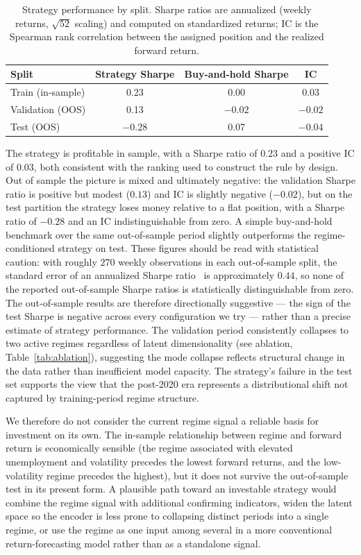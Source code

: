 \documentclass[conference]{IEEEtran}
\begin{document}
\begin{table}[h]
\centering
\caption{Strategy performance by split. Sharpe ratios are annualized
(weekly returns, $\sqrt{52}$ scaling) and computed on standardized returns;
IC is the Spearman rank correlation between the assigned position and the
realized forward return.}
\label{tab:strategy-results}
\begin{tabular}{lccc}
\toprule
Split & Strategy Sharpe & Buy-and-hold Sharpe & IC \\
\midrule
Train (in-sample) & 0.23 & 0.00 & 0.03 \\
Validation (OOS) & 0.13 & $-0.02$ & $-0.02$ \\
Test (OOS) & $-0.28$ & 0.07 & $-0.04$ \\
\bottomrule
\end{tabular}
\end{table}

The strategy is profitable in sample, with a Sharpe ratio of $0.23$ and a
positive IC of $0.03$, both consistent with the ranking used to construct the
rule by design. Out of sample the picture is mixed and ultimately negative: the
validation Sharpe ratio is positive but modest ($0.13$) and IC is slightly
negative ($-0.02$), but on the test partition the strategy loses money relative
to a flat position, with a Sharpe ratio of $-0.28$ and an IC indistinguishable
from zero. A simple buy-and-hold benchmark over the same out-of-sample period
slightly outperforms the regime-conditioned strategy on test. These figures
should be read with statistical caution: with roughly $270$ weekly observations
in each out-of-sample split, the standard error of an annualized Sharpe
ratio~\cite{lo2002statistics} is approximately $0.44$, so none of the reported
out-of-sample Sharpe ratios is statistically distinguishable from zero. The
out-of-sample results are therefore directionally suggestive --- the sign of the
test Sharpe is negative across every configuration we try --- rather than a
precise estimate of strategy performance. The validation period consistently
collapses to two active regimes regardless of latent
dimensionality (see ablation, Table~\ref{tab:ablation}), suggesting the mode collapse
reflects structural change in the data rather than insufficient model capacity.
The strategy's failure in the test set supports the view that the post-2020
era represents a distributional shift not captured by training-period regime structure.

We therefore do not consider the current regime signal a reliable basis for
investment on its own. The in-sample relationship between regime and forward
return is economically sensible (the regime associated with elevated
unemployment and volatility precedes the lowest forward returns, and the
low-volatility regime precedes the highest), but it does not survive the
out-of-sample test in its present form. A plausible path toward an investable
strategy would combine the regime signal with additional confirming
indicators, widen the latent space so the encoder is less prone to collapsing
distinct periods into a single regime, or use the regime as one input among
several in a more conventional return-forecasting model rather than as a
standalone signal.
\end{document}
